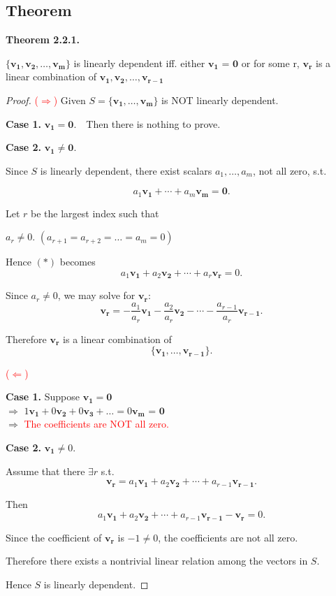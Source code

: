 \documentclass[12pt]{article}
\begin{document}
\subsection{Theorem}

\textbf{Theorem 2.2.1.} 

$\{\mathbf{v_1}, \mathbf{v_2}, \ldots, \mathbf{v_m}\}$ is linearly dependent iff. either $\mathbf{v_1}$ = $\mathbf{0}$ or
for some r, $\mathbf{v_r}$ is a linear combination of  $\mathbf{v_1}, \mathbf{v_2}, \ldots, \mathbf{v_{r - 1}}$
\begin{proof}

\textcolor{red}{($\Rightarrow$)} Given $S=\{\mathbf{v_1},\dots,\mathbf{v_m}\}$ is NOT linearly dependent.

\textbf{Case 1.} $\mathbf{v_1}=\mathbf{0}$.$\quad$Then there is nothing to prove.

\textbf{Case 2.} $\mathbf{v_1}\neq \mathbf{0}$.

Since $S$ is linearly dependent, there exist scalars
$a_1, \ldots, a_m$, not all zero, s.t.

\[
a_1\mathbf{v_1} + \cdots + a_m\mathbf{v_m}=\mathbf{0}.
\]

Let $r$ be the largest index such that

\begin{center}
    $a_r\neq 0.$ $(a_{r+1} = a_{r+2} = \ldots = a_m = 0)$
\end{center}

Hence $(*)$ becomes
\[
a_1\mathbf{v_1} + a_2\mathbf{v_2} + \cdots + a_r\mathbf{v_r} = 0.
\]

Since $a_r\neq 0$, we may solve for $\mathbf{v_r}$:
\[
\mathbf{v_r}
=
-\frac{a_1}{a_r}\mathbf{v_1}
-\frac{a_2}{a_r}\mathbf{v_2}
-\cdots
-\frac{a_{r-1}}{a_r}\mathbf{v_{r-1}}.
\]

Therefore $\mathbf{v_r}$ is a linear combination of
\[
\{\mathbf{v_1},\dots,\mathbf{v_{r-1}}\}.
\]

\textcolor{red}{($\Leftarrow$)} 

\textbf{Case 1.} Suppose $\mathbf{v_1} = \mathbf{0}$\\
$\Rightarrow$ $1\mathbf{v_1} + 0\mathbf{v_2} + 0\mathbf{v_3} + \ldots = 0\mathbf{v_m}$ = $\mathbf{0}$ \\
$\Rightarrow$ \textcolor{red}{The coefficients are NOT all zero.}

\textbf{Case 2.} $\mathbf{v_1}\neq 0$.

Assume that there  $\exists r$ s.t.
\[
\mathbf{v_r} = a_1\mathbf{v_1} + a_2\mathbf{v_2} + \cdots + a_{r-1}\mathbf{v_{r-1}}.
\]

Then
\[
a_1\mathbf{v_1} + a_2\mathbf{v_2} + \cdots + a_{r-1}\mathbf{v_{r-1}} - \mathbf{v_r} = 0.
\]

Since the coefficient of $\mathbf{v_r}$ is $-1\neq 0$,
the coefficients are not all zero.

Therefore there exists a nontrivial linear relation among the vectors in $S$.

Hence $S$ is linearly dependent.

\end{proof}
\end{document}
